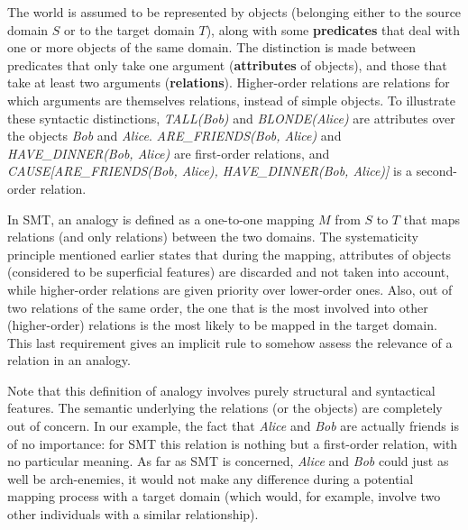 The world is assumed to be represented by objects (belonging either to the
source domain $S$ or to the target domain $T$), along with some
\textbf{predicates} that deal with one or more objects of the same domain. The
distinction is made between predicates that only take one argument
(\textbf{attributes} of objects), and those  that take at least two arguments 
(\textbf{relations}). Higher-order relations are relations for which arguments
are themselves relations, instead of simple objects. To illustrate these
syntactic distinctions, \textit{TALL(Bob)} and \textit{BLONDE(Alice)} are
attributes over the objects \textit{Bob} and \textit{Alice}.
\textit{ARE\_FRIENDS(Bob, Alice)} and \textit{HAVE\_DINNER(Bob, Alice)} are
first-order relations, and \textit{CAUSE[ARE\_FRIENDS(Bob, Alice),
HAVE\_DINNER(Bob, Alice)]} is a second-order relation.

In SMT, an analogy is defined as a one-to-one mapping $M$ from $S$ to $T$ that maps
relations (and only relations) between the two domains. The systematicity
principle mentioned earlier states that during the mapping, attributes of
objects (considered to be superficial features) are discarded and not taken
into account, while higher-order relations are given priority over lower-order
ones. Also, out of two relations of the same order, the one that is the most
involved into other (higher-order) relations is the most likely to be mapped in
the target domain. This last requirement gives an implicit rule to somehow
assess the relevance of a relation in an analogy.

Note that this definition of analogy involves purely structural and syntactical
features. The semantic underlying the relations (or the objects) are completely
out of concern. In our example, the fact that \textit{Alice} and \textit{Bob}
are actually friends is of no importance: for SMT this relation is nothing but
a first-order relation, with no particular meaning. As far as SMT is concerned,
\textit{Alice} and \textit{Bob} could just as well be arch-enemies, it would
not make any difference during a potential mapping process with a target domain
(which would, for example, involve two other individuals with a similar
relationship).

